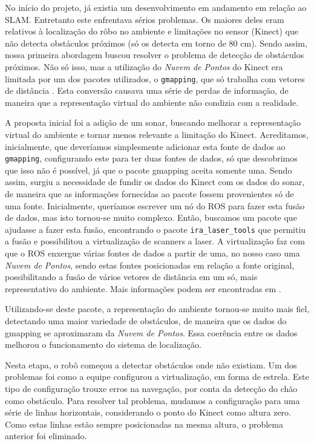 No início do projeto, já existia um desenvolvimento em andamento em relação ao SLAM. Entretanto este enfrentava sérios problemas. Os maiores deles eram relativos à localização do rôbo no ambiente e limitações no sensor (Kinect) que não detecta obstáculos próximos (só os detecta em torno de 80 cm). Sendo assim, nossa primeira abordagem buscou resolver o problema de detecção de obstáculos próximos. Não só isso, mas a utilização do \textit{Nuvem de Pontos} do Kinect era limitada por um dos pacotes utilizados, o \verb|gmapping|, que só trabalha com vetores de distância \cite{G_mapping}. Esta conversão causava uma série de perdas de informação, de maneira que a representação virtual do ambiente não condizia com a realidade. 

A proposta inicial foi a adição de um sonar, buscando melhorar a representação virtual do ambiente e tornar menos relevante a limitação do Kinect. Acreditamos, inicialmente, que deveríamos simplesmente adicionar esta fonte de dados ao \verb|gmapping|, configurando este para ter duas fontes de dados, só que descobrimos que isso não é possível, já que o pacote gmapping aceita somente uma. Sendo assim, surgiu a necessidade de fundir os dados do Kinect com os dados do sonar, de maneira que as informações fornecidas ao pacote fossem provenientes só de uma fonte. Inicialmente, queríamos escrever um nó do ROS para fazer esta fusão de dados, mas isto tornou-se muito complexo. Então, buscamos um pacote que ajudasse a fazer esta fusão, encontrando o pacote \verb|ira_laser_tools| que permitiu a fusão e possibilitou a virtualização de scanners a laser. A virtualização faz com que o ROS enxergue várias fontes de dados a partir de uma, no nosso caso uma \textit{Nuvem de Pontos}, sendo estas fontes posicionadas em relação a fonte original, possibilitando a fusão de vários vetores de distância em um só, mais representativo do ambiente. Mais informações podem ser encontradas em \cite{iraLaserTools}.

Utilizando-se deste pacote, a representação do ambiente tornou-se muito mais fiel, detectando uma maior variedade de obstáculos, de maneira que os dados do gmapping se aproximaram da \textit{Nuvem de Pontos}. Essa coerência entre os dados melhorou o funcionamento do sistema de localização.

Nesta etapa, o robô começou a detectar obstáculos onde não existiam. Um dos problemas foi como a equipe configurou a virtualização, em forma de estrela. Este tipo de configuração trouxe erros na navegação, por conta da detecção do chão como obstáculo. Para resolver tal problema, mudamos a configuração para uma série de linhas horizontais, considerando o ponto do Kinect como altura zero. Como estas linhas estão sempre posicionadas na mesma altura, o problema anterior foi eliminado. 

